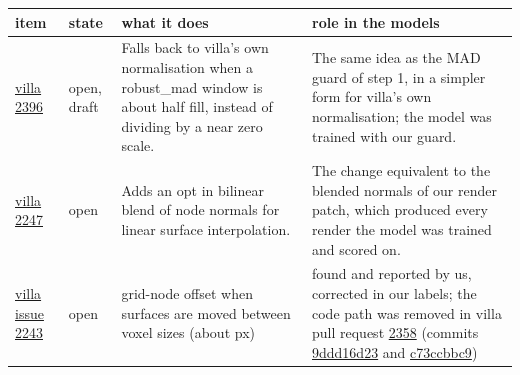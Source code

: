 {\small\setlength{\tabcolsep}{3pt}
\noindent\begin{tabular}{@{}p{2.2cm}p{1.6cm}p{4.6cm}p{6.4cm}@{}}
\hline
item & state & what it does & role in the models \\
\hline
\href{https://github.com/ScrollPrize/villa/pull/2396}{villa 2396} & open, draft & Falls back to villa's own normalisation when a robust\_mad window is about half fill, instead of dividing by a near zero scale. & The same idea as the MAD guard of step 1, in a simpler form for villa's own normalisation; the model was trained with our guard. \\
\href{https://github.com/ScrollPrize/villa/pull/2247}{villa 2247} & open & Adds an opt in bilinear blend of node normals for linear surface interpolation. & The change equivalent to the blended normals of our render patch, which produced every render the model was trained and scored on. \\
\href{https://github.com/ScrollPrize/villa/issues/2243}{villa issue 2243} & open & grid-node offset when surfaces are moved between voxel sizes (about \MALabelOffsetHigh{} px) & found and reported by us, corrected in our labels; the code path was removed in villa pull request \href{https://github.com/ScrollPrize/villa/pull/2358}{2358} (commits \href{https://github.com/ScrollPrize/villa/pull/2358/commits/9ddd16d23c7d7585a526ae26a6aefcdd68414516}{9ddd16d23} and \href{https://github.com/ScrollPrize/villa/pull/2358/commits/c73ccbbc9e18e5062ea611692cc274d55305435d}{c73ccbbc9}) \\
\hline
\end{tabular}}
